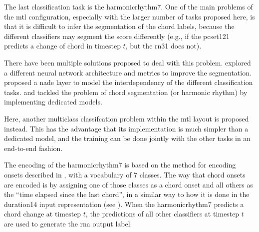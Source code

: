 
The last classification task is the \gls{harmonicrhythm7}.
One of the main problems of the \gls{mtl} configuration,
especially with the larger number of tasks proposed here, is
that it is difficult to infer the segmentation of the chord
labels, because the different classifiers may segment the
score differently (e.g., if the \gls{pcset121} predicts a
change of chord in timestep $t$, but the \gls{rn31} does
not).

There have been multiple solutions proposed to deal with
this problem. \textcite{chen2021attend} explored a different
neural network architecture and metrics to improve the
segmentation. \textcite{micchi2021deep} proposed a
\gls{nade} layer to model the interdependency of the
different classification tasks. \textcite{mcleod2021modular}
and \textcite{wu2021melody} tackled the problem of chord
segmentation (or harmonic rhythm) by implementing dedicated
models. 

Here, another multiclass classifcation problem within the
\gls{mtl} layout is proposed instead. This has the advantage
that its implementation is much simpler than a dedicated
model, and the training can be done jointly with the other
tasks in an end-to-end fashion.

The encoding of the \gls{harmonicrhythm7} is based on the
method for encoding onsets described in
, with a
vocabulary of 7 classes. The way that chord onsets are
encoded is by assigning one of those classes as a chord
onset and all others as the ``time elapsed since the last
chord'', in a similar way to how it is done in the
\gls{duration14} input representation (see
). When the
\gls{harmonicrhythm7} predicts a chord change at timestep
$t$, the predictions of all other classifiers at timestep
$t$ are used to generate the \gls{rna} output label.
